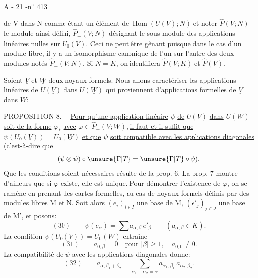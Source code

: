 A - 21 -\hfill n\textsuperscript{o} 413

de V dans N comme étant un élément de $\operatorname{Hom}(U(\underline V);N)$ et noter $\widehat P(\underline V;N)$ le module ainsi défini, $\widehat P_+(\underline V;N)$ désignant le sous-module des applications linéaires nulles sur $U_0(\underline V)$. Ceci ne peut être gênant puisque dans le cas d'un module libre, il y a un isomorphisme canonique de l'un sur l'autre des deux modules notés $\widehat P_+(\underline V;N)$.
Si $N=K$, on identifiera $\widehat P(\underline V;K)$ et $\widehat P(\underline V)$.

Soient $\underline V$ et $\underline W$ deux noyaux formels. Nous allons caractériser les applications linéaires de $U(\underline V)$ dans $U(\underline W)$ qui proviennent d'applications formelles de $\underline V$ dans $\underline W$:

PROPOSITION 8.--- \uline{Pour qu'une application linéaire} $\psi$ \uline{de} $U(\underline V)$ \uline{dans} $U(\underline W)$ \uline{soit de la forme} $\varphi_*$ \uline{avec} $\varphi\in\widehat P_+(\underline V;\underline W)$, \uline{il faut et il suffit que} $\psi(U_0(\underline V))=U_0(\underline W)$ \uline{et que} $\psi$ \uline{soit compatible avec les applications diagonales} (\uline{c'est-à-dire que}
\[
(\psi\otimes\psi)\circ\unsure{\Gamma|T}=\unsure{\Gamma|T}\circ\psi).
\]
Que les conditions soient nécessaires résulte de la prop. 6. La prop. 7 montre d'ailleurs que si $\varphi$ existe, elle est unique. Pour démontrer l'existence de $\varphi$, on se ramène en prenant des cartes formelles, au cas de noyaux formels définis par des modules libres M et N. Soit alors $(e_i)_{i\in I}$ une base de M, $(e'_j)_{j\in J}$ une base de M', et posons:
\[
(30)\qquad\psi(e_\alpha)=\sum a_{\alpha,\beta}\,e'_\beta\qquad(a_{\alpha,\beta}\in K).
\]
La condition $\psi(U_0(V))=U_0(W)$ entraîne
\[
(31)\qquad a_{0,\beta}=0\quad\text{pour }|\beta|\geq1,\quad a_{0,0}\ne0.
\]
La compatibilité de $\psi$ avec les applications diagonales donne:
\[
(32)\qquad a_{\alpha,\beta_1+\beta_2}=\sum_{\alpha_1+\alpha_2=\alpha}a_{\alpha_1,\beta_1}\,a_{\alpha_2,\beta_2}.
\]
